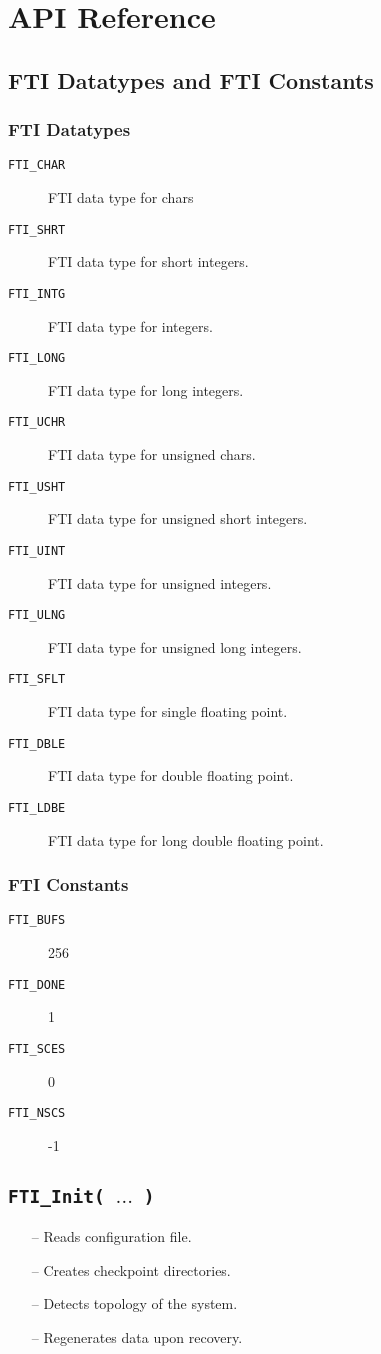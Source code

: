 \documentclass{refrep}
\begin{document}
\chapter{API Reference}\label{ch:apireference}
\section{FTI Datatypes and FTI Constants}\label{sec:datatypesandconstants}
\subsection{FTI Datatypes}\label{sec:datatypes}
\begin{description}
\item[\tt{FTI\_CHAR}] FTI data type for chars
\item[\tt{FTI\_SHRT}] FTI data type for short integers.
\item[\tt{FTI\_INTG}] FTI data type for integers.
\item[\tt{FTI\_LONG}] FTI data type for long integers.
\item[\tt{FTI\_UCHR}] FTI data type for unsigned chars.
\item[\tt{FTI\_USHT}] FTI data type for unsigned short integers.
\item[\tt{FTI\_UINT}] FTI data type for unsigned integers.
\item[\tt{FTI\_ULNG}] FTI data type for unsigned long integers.
\item[\tt{FTI\_SFLT}] FTI data type for single floating point.
\item[\tt{FTI\_DBLE}] FTI data type for double floating point.
\item[\tt{FTI\_LDBE}] FTI data type for long double floating point.
\end{description}
\subsection{FTI Constants}
\begin{description}
\item[\tt{FTI\_BUFS}] 256
\item[\tt{FTI\_DONE}] 1
\item[\tt{FTI\_SCES}] 0
\item[\tt{FTI\_NSCS}] -1
\end{description}
\newpage
\section{\tt FTI\_Init( $\dots$ )}\label{sec:ftiinit}
\begin{framed}
\begin{itemize}
\item[--] Reads configuration file.
\item[--] Creates checkpoint directories.
\item[--] Detects topology of the system.
\item[--] Regenerates data upon recovery.
\end{itemize}
\end{framed}
\end{document}
